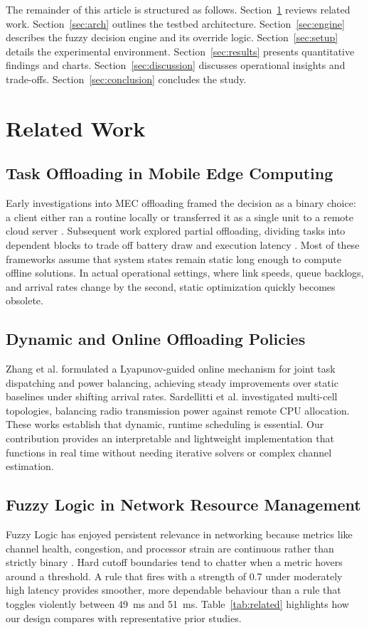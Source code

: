 \documentclass[conference]{IEEEtran}
\begin{document}
The remainder of this article is structured as follows. Section~\ref{sec:related} reviews related work. Section~\ref{sec:arch} outlines the testbed architecture. Section~\ref{sec:engine} describes the fuzzy decision engine and its override logic. Section~\ref{sec:setup} details the experimental environment. Section~\ref{sec:results} presents quantitative findings and charts. Section~\ref{sec:discussion} discusses operational insights and trade-offs. Section~\ref{sec:conclusion} concludes the study.

\section{Related Work}
\label{sec:related}

\subsection{Task Offloading in Mobile Edge Computing}
Early investigations into MEC offloading framed the decision as a binary choice: a client either ran a routine locally or transferred it as a single unit to a remote cloud server \cite{you2016energy}. Subsequent work explored partial offloading, dividing tasks into dependent blocks to trade off battery draw and execution latency \cite{chen2016efficient}. Most of these frameworks assume that system states remain static long enough to compute offline solutions. In actual operational settings, where link speeds, queue backlogs, and arrival rates change by the second, static optimization quickly becomes obsolete.

\subsection{Dynamic and Online Offloading Policies}
Zhang et al. \cite{zhang2018joint} formulated a Lyapunov-guided online mechanism for joint task dispatching and power balancing, achieving steady improvements over static baselines under shifting arrival rates. Sardellitti et al. \cite{sardellitti2015joint} investigated multi-cell topologies, balancing radio transmission power against remote CPU allocation. These works establish that dynamic, runtime scheduling is essential. Our contribution provides an interpretable and lightweight implementation that functions in real time without needing iterative solvers or complex channel estimation.

\subsection{Fuzzy Logic in Network Resource Management}
Fuzzy Logic has enjoyed persistent relevance in networking because metrics like channel health, congestion, and processor strain are continuous rather than strictly binary \cite{zadeh1965fuzzy}. Hard cutoff boundaries tend to chatter when a metric hovers around a threshold. A rule that fires with a strength of 0.7 under moderately high latency provides smoother, more dependable behaviour than a rule that toggles violently between 49~ms and 51~ms. Table~\ref{tab:related} highlights how our design compares with representative prior studies.
\end{document}
